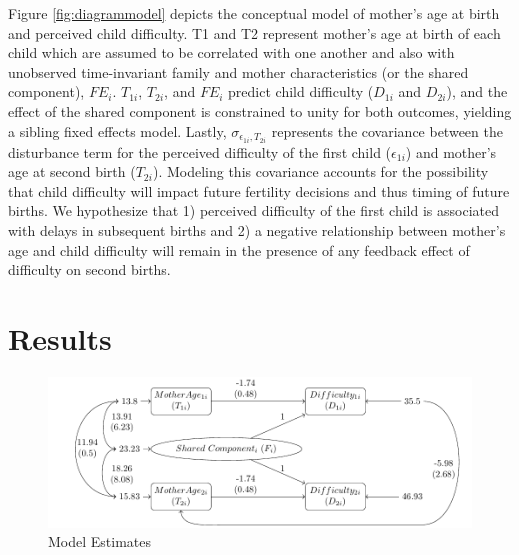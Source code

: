 \documentclass[]{article}
\begin{document}
Figure \ref{fig:diagrammodel} depicts the conceptual model of mother's
age at birth and perceived child difficulty. T1 and T2 represent
mother's age at birth of each child which are assumed to be correlated
with one another and also with unobserved time-invariant family and
mother characteristics (or the shared component), \(FE_{i}\).
\(T_{1i}\), \(T_{2i}\), and \(FE_{i}\) predict child difficulty
(\(D_{1i}\) and \(D_{2i}\)), and the effect of the shared component is
constrained to unity for both outcomes, yielding a sibling fixed effects
model. Lastly, \(\sigma_{\epsilon_{1i},T_{2i}}\) represents the
covariance between the disturbance term for the perceived difficulty of
the first child (\(\epsilon_{1i}\)) and mother's age at second birth
(\(T_{2i}\)). Modeling this covariance accounts for the possibility that
child difficulty will impact future fertility decisions and thus timing
of future births. We hypothesize that 1) perceived difficulty of the
first child is associated with delays in subsequent births and 2) a
negative relationship between mother's age and child difficulty will
remain in the presence of any feedback effect of difficulty on second
births.

\section{Results}\label{results}

\begin{figure}
\includegraphics[width=0.8\linewidth]{diagram_estimates} \caption{Model Estimates}\label{fig:diagramestimates}
\end{figure}
\end{document}
